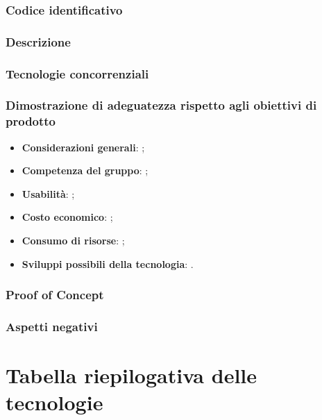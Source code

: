 \documentclass[./../Technology Baseline.tex]{subfiles}
\begin{document}
\subsubsection{Codice identificativo}
\subsubsection{Descrizione}
\subsubsection{Tecnologie concorrenziali}
\subsubsection{Dimostrazione di adeguatezza rispetto agli obiettivi di prodotto}
\begin{itemize}
	\item \textbf{Considerazioni generali}: ;
	\item \textbf{Competenza del gruppo}: ;
	\item \textbf{Usabilità}: ;
	\item \textbf{Costo economico}: ;
	\item \textbf{Consumo di risorse}: ;
	\item \textbf{Sviluppi possibili della tecnologia}: .
\end{itemize}
\subsubsection{Proof of Concept}
\subsubsection{Aspetti negativi}
\section{Tabella riepilogativa delle tecnologie}
\end{document}
